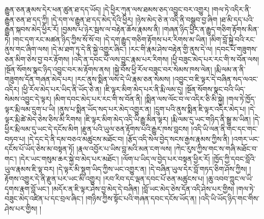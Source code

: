 རྒྱུན་ཅན་རྣམས་དེར་ཕན་ཚུན་ཐ་དད་ཡོད། །དེ་ཕྱིར་ཀུན་ལས་ཐམས་ཅད་འབྱུང་བར་འགྱུར། །གལ་ཏེ་འདིར་ནི་རྒྱུན་ཅན་ཐ་དད་ཀྱི། །དེ་དག་ལ་རྒྱུན་ཐ་དད་མེད་དེའི་ཕྱིར། །ཉེས་མེད་ཅེ་ན་འདི་ནི་བསྒྲུབ་བྱ་ཞིག །ཐ་མི་དད་པའི་རྒྱུན་སྐབས་མེད་ཕྱིར་རོ། །བྱམས་པ་ཉེར་སྦས་ལ་བརྟེན་ཆོས་རྣམས་ནི། །གཞན་ཉིད་ཕྱིར་ན་རྒྱུད་གཅིག་རྟོགས་མིན་ཏེ། །གང་དག་རང་མཚན་ཉིད་ཀྱིས་སོ་སོ་བ། །དེ་དག་རྒྱུད་གཅིག་རྟོགས་པར་རིགས་མ་ཡིན། །མིག་བློ་སྐྱེ་བའི་རང་ནུས་གང་ཞིག་ལས། །དེ་མ་ཐག་ཏུ་དེ་ནི་སྐྱེ་འགྱུར་ཞིང་། །རང་གི་རྣམ་ཤེས་བརྟེན་གྱི་ནུས་དེ་ལ། །དབང་པོ་གཟུགས་ཅན་མིག་ཅེས་བྱ་བར་རྟོགས། །འདི་ན་དབང་པོ་ལས་བྱུང་རྣམ་པར་རིགས། །ཕྱི་བཟུང་མེད་པར་རང་གི་ས་བོན་ལས། །སྔོན་སོགས་སྣང་ཉིད་འབྱུང་བར་མ་རྟོགས་ནས། །སྐྱེ་བོས་ཕྱི་རོལ་བཟུང་བར་སེམས་ཁས་ལེན། །རྨི་ལམ་ན་ནི་གཟུགས་དོན་གཞན་མེད་པར། །རང་ནུས་སྨིན་ལས་དེ་ཡི་རྣམ་ཅན་སེམས། །འབྱུང་བ་ཇི་ལྟར་དེ་བཞིན་སད་ལའང་འདིར། །ཕྱི་རོལ་མེད་པར་ཡིད་ནི་ཡོད་ཅེ་ན། །ཇི་ལྟར་མིག་མེད་པར་ནི་རྨི་ལམ་དུ། །སྔོན་སོགས་སྣང་བའི་ཡིད་སེམས་འབྱུང་དེ་ལྟར། །མིག་དབང་མེད་པར་རང་གི་ས་བོན་ནི། །སྨིན་ལས་ལོང་བ་ལ་འདིར་ཅི་མི་སྐྱེ། །གལ་ཏེ་ཁྱོད་ལྟར་རྨི་ལམ་དྲུག་པ་ཡི། །ནུས་པ་སྨིན་ཡོད་སད་པར་མེད་འགྱུར་ན། །དྲུག་པའི་ནུས་སྨིན་ཇི་ལྟར་འདིར་མེད་པ། །དེ་ལྟར་རྨི་ཚེ་མེད་ཅེས་ཅིས་མི་རིགས། །ཇི་ལྟར་མིག་མེད་འདི་ཡི་རྒྱུ་མིན་ལྟར། །རྨི་ལམ་དུ་ཡང་གཉིད་ནི་སྒྱུ་མ་ཡིན། །དེ་ཕྱིར་རྨི་ལམ་དུ་ཡང་དེ་དངོས་མིག །རྫུན་པའི་ཡུལ་ཅན་རྟོགས་པའི་རྒྱུར་ཁས་བླངས། །འདི་ཡི་ལན་ནི་གང་དང་གང་བཏབ་པ། །དེ་དང་དེ་ནི་དམ་བཅའ་མཚུངས་མཐོང་བ། །རྩོད་འདི་སེལ་བྱེད་སངས་རྒྱས་རྣམས་ཀྱིས་ནི། །འགར་ཡང་དངོས་པོ་ཡོད་ཅེས་མ་བསྟན་ཏོ། །རྣལ་འབྱོར་པ་ཡིས་བླ་མའི་མན་ངག་ལས། །ཀེང་རུས་ཀྱིས་གང་ས་གཞི་མཐོང་བ་གང་། །དེར་ཡང་གསུམ་ཆར་སྐྱེ་བ་མེད་པར་མཐོང་། །ལོག་པ་ཡིད་ལ་བྱེད་པར་བསྟན་ཕྱིར་རོ། །ཁྱོད་ཀྱི་དབང་བློའི་ཡུལ་རྣམས་ཇི་ལྟ་བར། །དེ་ལྟར་མི་སྡུག་ཡིད་ཀྱིས་ཡང་འགྱུར་ན། །དེ་བཞིན་ཡུལ་དེར་བློ་གཏད་ཅིག་ཤོས་ཀྱིས། །རྟོགས་འགྱུར་དེ་ནི་རྫུན་པར་ཡང་མི་འགྱུར། །རབ་རིབ་དང་ལྡན་དབང་པོ་ཅན་མཚུངས་པ། །ཆུ་འབབ་ཀླུང་ལ་ཡི་དྭགས་རྣག་བློ་ཡང་། །མདོར་ན་ཇི་ལྟར་ཤེས་བྱ་མེད་དེ་བཞིན། །བློ་ཡང་མེད་ཅེས་དོན་འདི་ཤེས་པར་གྱིས། །གལ་ཏེ་བཟུང་མེད་འཛིན་པ་དང་བྲལ་ཞིང་། །གཉིས་ཀྱིས་སྟོང་པའི་གཞན་དབང་དངོས་ཡོད་ན། །འདི་ཡི་ཡོད་ཉིད་གང་གིས་ཤེས་པར་གྱིས། །
